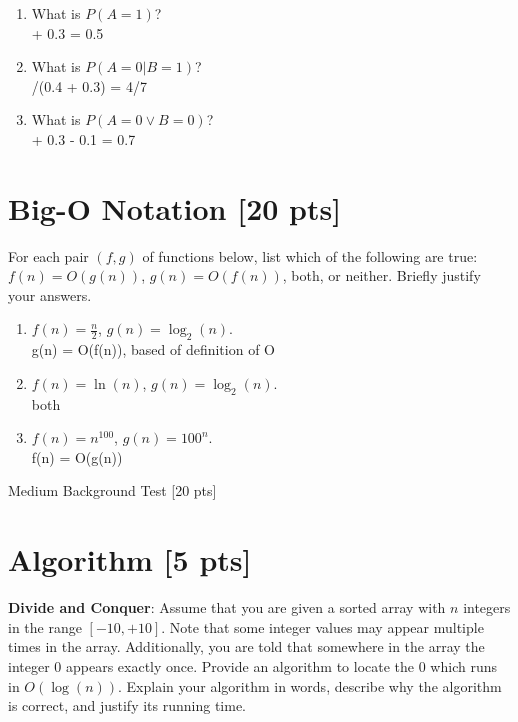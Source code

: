 \documentclass[a4paper]{article}
\theoremstyle{definition}
\newenvironment{soln}{
    \leavevmode\color{blue}\ignorespaces
}{}
\begin{document}
\begin{enumerate}
\begin{enumerate}
	    \begin{soln}  0.1 \end{soln}
	\item 	What is $P(A = 1)$?\\
	    \begin{soln}  0.2 + 0.3 = 0.5 \end{soln}
	\item 	What is $P(A = 0 | B = 1)$?\\
	    \begin{soln}  0.4/(0.4 + 0.3) = 4/7 \end{soln}
	\item 	What is $P(A = 0 \vee B = 0 )$?\\
	    \begin{soln}  0.5 + 0.3 - 0.1 = 0.7 \end{soln}
\end{enumerate}
\end{enumerate}


\section{Big-O Notation [20 pts]}
For each pair $(f, g)$ of functions below, list which of the following
are true: $f(n) = O(g(n))$, $g(n) = O(f(n))$, both, or
neither. Briefly justify your answers.
\begin{enumerate}
	\item 	$f(n) = \frac{n}{2}$, $g(n) = \log_{2}(n)$.\\
	    \begin{soln}  g(n) = O(f(n)), based of definition of O \end{soln}
	\item 	$f(n) = \ln(n)$, $g(n) = \log_{2}(n)$.\\
	    \begin{soln}  both \end{soln}
	\item 	$f(n) = n^{100}$, $g(n) = 100^n$.\\
	    \begin{soln}   f(n) = O(g(n)) \end{soln}
\end{enumerate}


\clearpage  %


\begin{center}
\Huge
Medium Background Test [20 pts]
\end{center}

\section{Algorithm [5 pts]}
\textbf{Divide and Conquer}: Assume that you are given a sorted array
with $n$ integers in the range $[-10, +10]$. Note that some integer values
may appear multiple times in the array. Additionally, you are
told that somewhere in the array the integer $0$ appears exactly once. Provide an
algorithm to locate the $0$ which runs in $O(\log(n))$. Explain your
algorithm in words, describe why the algorithm is correct, and justify
its running time.\\
\end{document}
